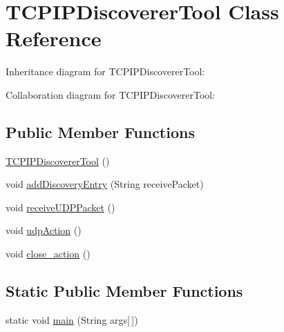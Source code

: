 \hypertarget{class_t_c_p_i_p___discoverer_1_1_t_c_p_i_p_discoverer_tool}{}\section{T\+C\+P\+I\+P\+Discoverer\+Tool Class Reference}
\label{class_t_c_p_i_p___discoverer_1_1_t_c_p_i_p_discoverer_tool}


Inheritance diagram for T\+C\+P\+I\+P\+Discoverer\+Tool\+:


Collaboration diagram for T\+C\+P\+I\+P\+Discoverer\+Tool\+:
\subsection*{Public Member Functions}
\begin{DoxyCompactItemize}
\item 
\hyperlink{class_t_c_p_i_p___discoverer_1_1_t_c_p_i_p_discoverer_tool_a88b9d45f9313b52a1f1008cd9b0d79a8}{T\+C\+P\+I\+P\+Discoverer\+Tool} ()
\item 
void \hyperlink{class_t_c_p_i_p___discoverer_1_1_t_c_p_i_p_discoverer_tool_a96fad9a3cabe168ba7e294839da19143}{add\+Discovery\+Entry} (String receive\+Packet)
\item 
void \hyperlink{class_t_c_p_i_p___discoverer_1_1_t_c_p_i_p_discoverer_tool_a7fe3e926c7719a4fd90e709f2dda78e2}{receive\+U\+D\+P\+Packet} ()
\item 
void \hyperlink{class_t_c_p_i_p___discoverer_1_1_t_c_p_i_p_discoverer_tool_a9095c4e56e90702a98c16737f2b4edf5}{udp\+Action} ()
\item 
void \hyperlink{class_t_c_p_i_p___discoverer_1_1_t_c_p_i_p_discoverer_tool_a3fc34c308c8e0c06dd1d0e7b8768a837}{close\+\_\+action} ()
\end{DoxyCompactItemize}
\subsection*{Static Public Member Functions}
\begin{DoxyCompactItemize}
\item 
static void \hyperlink{class_t_c_p_i_p___discoverer_1_1_t_c_p_i_p_discoverer_tool_a75988cf84fc6ee7a2ebff36e363021aa}{main} (String args\mbox{[}$\,$\mbox{]})
\end{DoxyCompactItemize}
